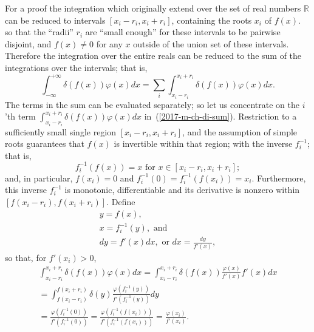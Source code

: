 {For a proof\cite{Cortizo-95} the integration which originally extend over the set of real numbers $\mathbb{R}$
can be reduced to intervals $[x_i-r_i,x_i+r_i]$, containing the roots $x_i$ of $f(x)$.
so that  the ``radii'' $r_i$  are ``small enough'' for these intervals to be pairwise disjoint,
and $f(x) \neq 0$ for any $x$ outside of the union set of these intervals.
Therefore the integration over the entire reals can be reduced to the sum of the integrations
over the intervals; that is,
\begin{equation}
\int_{-\infty}^{+\infty} \delta (f(x)) \varphi(x) dx
=
\sum_i
\int_{x_i-r_i}^{x_i+r_i} \delta (f(x)) \varphi(x) dx
.
\label{2017-m-ch-di-sum}
\end{equation}
The terms in the sum can be evaluated separately; so let us concentrate on the $i$'th term
$\int_{x_i-r_i}^{x_i+r_i} \delta (f(x)) \varphi(x) dx    $ in~(\ref{2017-m-ch-di-sum}).
Restriction to a sufficiently small single region $[x_i-r_i,x_i+r_i]$, and the assumption of simple roots
guarantees that $f(x)$ is invertible within that region; with the inverse $f_i^{-1}$; that is,
\begin{equation}
f_i^{-1}(f(x))=x \text{ for } x \in  [x_i-r_i,x_i+r_i]
;
\end{equation}
and, in particular, $f(x_i)=0$ and $f_i^{-1}(0) =f_i^{-1}(f(x_i))=x_i$.
Furthermore, this inverse $f_i^{-1}$ is monotonic, differentiable and its derivative is nonzero within $[f(x_i-r_i),f(x_i+r_i)]$.
Define
\begin{equation}
\begin{split}
y = f(x),\\
x = f_i^{-1} (y), \text{ and}\\
dy = f'(x) dx , \text{ or } dx = \frac{dy}{f'(x)}
,
\end{split}
\end{equation}
 so that, for  $f'(x_i)>0$,
\begin{equation}
\begin{split}
\int_{x_i-r_i}^{x_i+r_i} \delta (f(x)) \varphi(x) dx
=
\int_{x_i-r_i}^{x_i+r_i} \delta (f(x)) \frac{\varphi(x)}{f'(x)} f'(x)  dx   \\
=
\int_{f(x_i-r_i)}^{f(x_i+r_i)} \delta (y) \frac{\varphi(f_i^{-1} (y))}{f'(f_i^{-1} (y))}   dy  \\
=  \frac{\varphi(f_i^{-1} (0))}{f'(f_i^{-1} (0))}
=  \frac{\varphi(f_i^{-1} (f(x_i)))}{f'(f_i^{-1} (f(x_i)))}
=  \frac{\varphi( x_i)}{f'( x_i )}.
\end{split}

\end{equation}}
